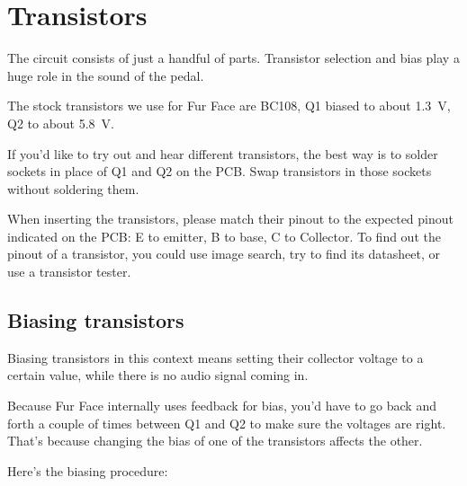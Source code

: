 \documentclass[a4paper,12pt]{article}
\begin{document}
\pagebreak

\section{Transistors}
\label{sec:transistors}

The circuit consists of just a handful of parts. Transistor
selection and bias play a huge role in the sound of the
pedal.

The stock transistors we use for Fur Face are BC108, Q1
biased to about \SI{1.3}{\V}, Q2 to about \SI{5.8}{\V}.

If you'd like to try out and hear different transistors, the
best way is to solder sockets in place of Q1 and Q2 on the
PCB. Swap transistors in those sockets without soldering
them.

When inserting the transistors, please match their pinout to
the expected pinout indicated on the PCB: E to emitter, B to
base, C to Collector. To find out the pinout of a
transistor, you could use image search, try to find its
datasheet, or use a transistor tester.



\subsection{Biasing transistors}
\label{sec:bias}

Biasing transistors in this context means setting their
collector voltage to a certain value, while there is no
audio signal coming in.

Because Fur Face internally uses feedback for bias, you'd
have to go back and forth a couple of times between Q1 and
Q2 to make sure the voltages are right. That's because
changing the bias of one of the transistors affects the
other.

Here's the biasing procedure:
\end{document}
